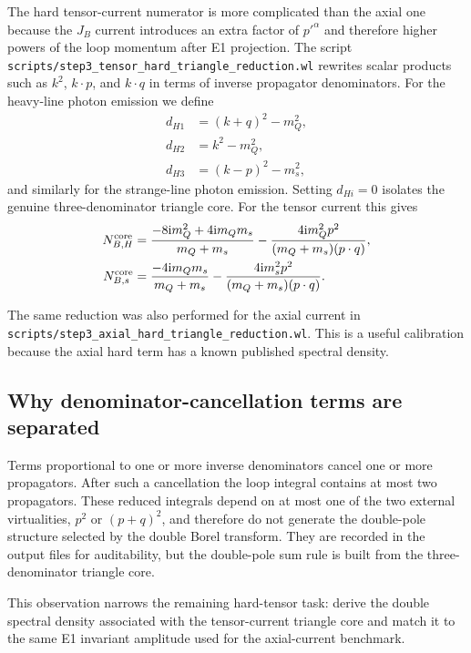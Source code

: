 \documentclass[11pt]{article}
\newcommand{\ii}{\mathrm{i}}
\begin{document}
The hard tensor-current numerator is more complicated than the axial one because
the $J_B$ current introduces an extra factor of $p'^\alpha$ and therefore higher
powers of the loop momentum after E1 projection.  The script
\texttt{scripts/step3\_tensor\_hard\_triangle\_reduction.wl} rewrites scalar
products such as $k^2$, $k\cdot p$, and $k\cdot q$ in terms of inverse
propagator denominators.  For the heavy-line photon emission we define
\begin{align}
  d_{H1}&=(k+q)^2-m_Q^2,\\
  d_{H2}&=k^2-m_Q^2,\\
  d_{H3}&=(k-p)^2-m_s^2,
\end{align}
and similarly for the strange-line photon emission.  Setting
$d_{Hi}=0$ isolates the genuine three-denominator triangle core.  For the
tensor current this gives
\begin{align}
  N_{B,H}^{\rm core}
  &=
  \frac{-8\ii m_Q^2+4\ii m_Qm_s}{m_Q+m_s}
  -
  \frac{4\ii m_Q^2 p^2}{(m_Q+m_s)(p\cdot q)},\\
  N_{B,s}^{\rm core}
  &=
  \frac{-4\ii m_Qm_s}{m_Q+m_s}
  -
  \frac{4\ii m_s^2 p^2}{(m_Q+m_s)(p\cdot q)}.
\end{align}

The same reduction was also performed for the axial current in
\texttt{scripts/step3\_axial\_hard\_triangle\_reduction.wl}.  This is a useful
calibration because the axial hard term has a known published spectral density.

\subsection{Why denominator-cancellation terms are separated}

Terms proportional to one or more inverse denominators cancel one or more
propagators.  After such a cancellation the loop integral contains at most two
propagators.  These reduced integrals depend on at most one of the two external
virtualities, $p^2$ or $(p+q)^2$, and therefore do not generate the double-pole
structure selected by the double Borel transform.  They are recorded in the
output files for auditability, but the double-pole sum rule is built from the
three-denominator triangle core.

This observation narrows the remaining hard-tensor task: derive the double
spectral density associated with the tensor-current triangle core and match it
to the same E1 invariant amplitude used for the axial-current benchmark.
\end{document}

